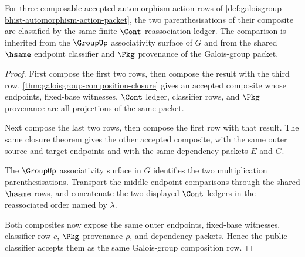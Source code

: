 \begin{theorem}
\label{thm:galoisgroup-associative-composition-ledger}
For three composable accepted automorphism-action rows of
\autoref{def:galoisgroup-bhist-automorphism-action-packet}, the two
parenthesisations of their composite are classified by the same finite
$\Cont$ reassociation ledger. The comparison is inherited from the
$\GroupUp$ associativity surface of $G$ and from the shared $\hsame$ endpoint
classifier and $\Pkg$ provenance of the Galois-group packet.
\end{theorem}
\begin{proof}
First compose the first two rows, then compose the result with the third row.
\autoref{thm:galoisgroup-composition-closure} gives an accepted composite
whose endpoints, fixed-base witnesses, $\Cont$ ledger, classifier rows, and
$\Pkg$ provenance are all projections of the same packet.

Next compose the last two rows, then compose the first row with that result.
The same closure theorem gives the other accepted composite, with the same
outer source and target endpoints and with the same dependency packets $E$
and $G$.

The $\GroupUp$ associativity surface in $G$ identifies the two multiplication
parenthesisations. Transport the middle endpoint comparisons through the
shared $\hsame$ rows, and concatenate the two displayed $\Cont$ ledgers in
the reassociated order named by $\lambda$.

Both composites now expose the same outer endpoints, fixed-base witnesses,
classifier row $c$, $\Pkg$ provenance $\rho$, and dependency packets. Hence
the public classifier accepts them as the same Galois-group composition row.
\end{proof}

